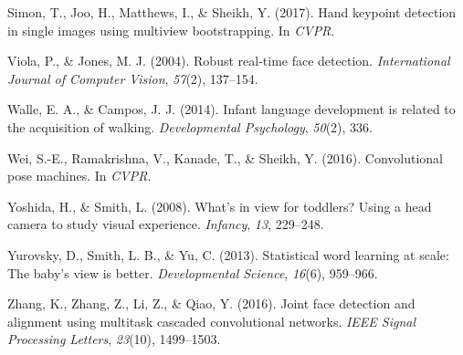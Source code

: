 \documentclass[10pt, letterpaper]{article}
\begin{document}
\hypertarget{ref-simon2017hand}{}
Simon, T., Joo, H., Matthews, I., \& Sheikh, Y. (2017). Hand keypoint
detection in single images using multiview bootstrapping. In
\emph{CVPR}.

\hypertarget{ref-viola2004robust}{}
Viola, P., \& Jones, M. J. (2004). Robust real-time face detection.
\emph{International Journal of Computer Vision}, \emph{57}(2), 137--154.

\hypertarget{ref-walle2014}{}
Walle, E. A., \& Campos, J. J. (2014). Infant language development is
related to the acquisition of walking. \emph{Developmental Psychology},
\emph{50}(2), 336.

\hypertarget{ref-wei2016cpm}{}
Wei, S.-E., Ramakrishna, V., Kanade, T., \& Sheikh, Y. (2016).
Convolutional pose machines. In \emph{CVPR}.

\hypertarget{ref-yoshida2008}{}
Yoshida, H., \& Smith, L. (2008). What's in view for toddlers? Using a
head camera to study visual experience. \emph{Infancy}, \emph{13},
229--248.

\hypertarget{ref-yurovsky2013statistical}{}
Yurovsky, D., Smith, L. B., \& Yu, C. (2013). Statistical word learning
at scale: The baby's view is better. \emph{Developmental Science},
\emph{16}(6), 959--966.

\hypertarget{ref-zhang2016}{}
Zhang, K., Zhang, Z., Li, Z., \& Qiao, Y. (2016). Joint face detection
and alignment using multitask cascaded convolutional networks.
\emph{IEEE Signal Processing Letters}, \emph{23}(10), 1499--1503.
\end{document}

